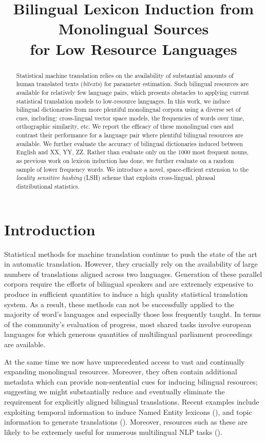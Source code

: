 \documentclass[11pt]{article}
\title{Bilingual Lexicon Induction from Monolingual Sources \\ for Low Resource Languages}
\date{}
\newcommand{\mnote}[1]{\marginpar{%
  \vskip-\baselineskip
  \raggedright\footnotesize
  \itshape\hrule\smallskip\tiny{#1}\par\smallskip\hrule}}
\newcommand{\mtodo}[1]{\mnote{\textcolor{red}{#1}}}
\begin{document}
\maketitle
\begin{abstract}
Statistical machine translation relies on the
availability of substantial amounts of human translated texts (\emph{bitexts})
for parameter estimation. Such bilingual resources are available for relatively few
language pairs, which presents obstacles to applying current statistical translation models to low-resource languages. In this work, we induce bilingual dictionaries from more plentiful monolingual corpora 
using a diverse set of cues, including: cross-lingual vector space models, the frequencies of words over time, orthographic similarity, etc.  We report the efficacy of these monolingual cues and contrast their performance for a language pair where plentiful bilingual resources are available.  We further evaluate the accuracy of bilingual dictionaries induced between English and XX, YY, ZZ.  Rather than evaluate only on the 1000 most frequent nouns, as previous work on lexicon induction has done, we further evaluate on a random sample of lower frequency words. 
We introduce a novel, space-efficient
extension to the \emph{locality sensitive hashing} (LSH) scheme that exploits cross-lingual, phrasal
distributional statistics.



\end{abstract}

\section{Introduction} \label{sect:intro}


Statistical methods for machine translation continue to push the state of the
art in automatic translation. However, they crucially rely on the availability
of large numbers of translations aligned across two languages. Generation of
these parallel corpora require the efforts of bilingual speakers and are
extremely expensive to produce in sufficient quantities to induce a high quality
statistical translation system. As a result, these methods can not be
successfully applied to the majority of word's languages and especially those
less frequently taught. In terms of the community's evaluation of progress, most
shared tasks involve european languages for which generous quantities of
multilingual parliament proceedings are available.

At the same time we now have unprecedented access to vast and continually
expanding monolingual resources. Moreover, they often contain additional
metadata which can provide non-sentential cues for inducing bilingual resources;
suggesting we might substantially reduce and eventually eliminate the
requirement for explicitly aligned bilingual translations. Recent examples
include exploiting temporal information to induce Named Entity lexicons
(\cite{Alex, David}), and topic information to generate translations
(\cite{Mimno}). Moreover, resources such as these are likely to be extremely
useful for numerous multilingual NLP tasks (\mtodo{Examples}).
\end{document}
